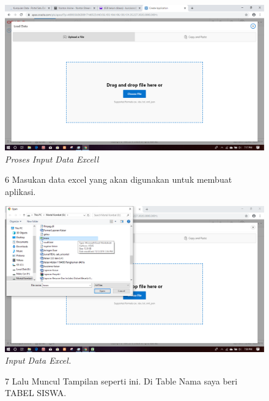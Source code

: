 \begin{enumerate}
\begin{figure}
    \begin{center}
\includegraphics[scale=0.2]{figures/5.png}
    \caption{\textit{{Proses Input Data Excel}l}}
        \end{center}
\label{gambar}
\end{figure}

\begin{figure}
\item[6] Masukan data excel yang akan digunakan untuk membuat aplikasi.

    \begin{center}
\includegraphics[scale=0.2]{figures/6.png}
    \caption{\textit{Input Data Excel.}}
        \end{center}
\label{gambar}
\end{figure}

\begin{figure}
\item[7] Lalu Muncul Tampilan seperti ini. Di Table Nama saya beri TABEL SISWA.


\end{figure}
\end{enumerate}
